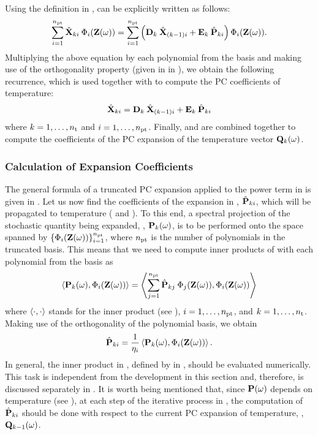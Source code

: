 Using the definition in ,  can be explicitly written as follows:
\[
  \sum_{i = 1}^{\pcterms} \pcc{\vX}_{ki} \: \pcb_i(\vZ(\o)) = \sum_{i = 1}^{\pcterms} \left( \mCF_k \: \pcc{\vX}_{(k - 1)i} + \mCS_k \: \pcc{\vP}_{ki} \right) \pcb_i(\vZ(\o)).
\]
Multiplying the above equation by each polynomial from the basis and making use of the orthogonality property (given in  in ), we obtain the following recurrence, which is used together with  to compute the PC coefficients of temperature:
\begin{equation} \elabel{pc-recurrence}
  \pcc{\vX}_{ki} = \mCF_k \: \pcc{\vX}_{(k - 1)i} + \mCS_k \: \pcc{\vP}_{ki}
\end{equation}
where $k = 1, \dotsc, {n_\text{t}}$ and $i = 1, \dotsc, {n_\text{pt}}$. Finally,  and  are combined together to compute the coefficients of the PC expansion of the temperature vector $\mathbf{Q}_k(\omega)$.

\subsubsection{Calculation of Expansion Coefficients}
The general formula of a truncated PC expansion applied to the power term in  is given in .
Let us now find the coefficients of the expansion in , $\hat{\mathbf{P}}_{ki}$, which will be propagated to temperature ( and ).
To this end, a spectral projection of the stochastic quantity being expanded, \ie, $\mathbf{P}_k(\omega)$, is to be performed onto the space spanned by $\{ \Phi_i(\mathbf{Z}(\omega)) \}_{i = 1}^{{n_\text{pt}}}$, where ${n_\text{pt}}$ is the number of polynomials in the truncated basis.
This means that we need to compute inner products of  with each polynomial from the basis as
\[
  \oInner{\vP_k(\o)}{\pcb_i(\vZ(\o))} = \oInner{\sum_{j=1}^{\pcterms} \pcc{\vP}_{kj} \: \pcb_j(\vZ(\o))}{\pcb_i(\vZ(\o))}
\]
where $\oInner{\idot}{\idot}$ stands for the inner product (see ), $i = 1, \dotsc, {n_\text{pt}}$, and $k = 1, \dotsc, {n_\text{t}}$. Making use of the orthogonality of the polynomial basis, we obtain
\begin{equation} \elabel{pc-coefficients}
  \pcc{\vP}_{ki} = \frac{1}{\pcn_i} \oInner{\vP_k(\o)}{\pcb_i(\vZ(\o))}.
\end{equation}
In general, the inner product in , defined by  in , should be evaluated numerically.
This task is independent from the development in this section and, therefore, is discussed separately in .
It is worth being mentioned that, since $\mathbf{P}(\omega)$ depends on temperature (see ), at each step of the iterative process in , the computation of $\hat{\mathbf{P}}_{ki}$ should be done with respect to the current PC expansion of temperature, \ie, $\mathbf{Q}_{k - 1}(\omega)$.

